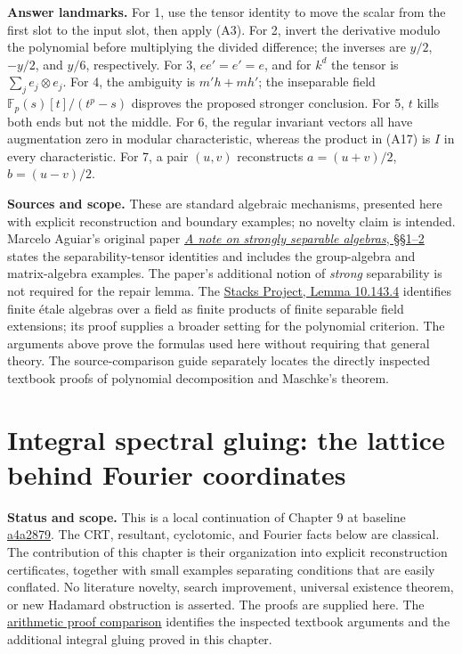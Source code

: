 \documentclass[
  11pt,
]{article}
\begin{document}
\textbf{Answer landmarks.} For 1, use the tensor identity to move the
scalar from the first slot to the input slot, then apply (A3). For 2,
invert the derivative modulo the polynomial before multiplying the
divided difference; the inverses are \(y/2\), \(-y/2\), and \(y/6\),
respectively. For 3, \(ee'=e'=e\), and for \(k^d\) the tensor is
\(\sum_j e_j\otimes e_j\). For 4, the ambiguity is \(m'h+mh'\); the
inseparable field \(\mathbb F_p(s)[t]/(t^p-s)\) disproves the proposed
stronger conclusion. For 5, \(t\) kills both ends but not the middle.
For 6, the regular invariant vectors all have augmentation zero in
modular characteristic, whereas the product in (A17) is \(I\) in every
characteristic. For 7, a pair \((u,v)\) reconstructs \(a=(u+v)/2\),
\(b=(u-v)/2\).

\textbf{Sources and scope.} These are standard algebraic mechanisms,
presented here with explicit reconstruction and boundary examples; no
novelty claim is intended. Marcelo Aguiar's original paper
\href{https://pi.math.cornell.edu/~maguiar/strongly.pdf}{\emph{A note on
strongly separable algebras}, §§1--2} states the separability-tensor
identities and includes the group-algebra and matrix-algebra examples.
The paper's additional notion of \emph{strong} separability is not
required for the repair lemma. The
\href{https://stacks.math.columbia.edu/tag/00U3}{Stacks Project, Lemma
10.143.4} identifies finite étale algebras over a field as finite
products of finite separable field extensions; its proof supplies a
broader setting for the polynomial criterion. The arguments above prove
the formulas used here without requiring that general theory. The
source-comparison guide separately locates the directly inspected
textbook proofs of polynomial decomposition and Maschke's theorem.

\section{Integral spectral gluing: the lattice behind Fourier
coordinates}\label{integral-spectral-gluing-the-lattice-behind-fourier-coordinates}

\textbf{Status and scope.} This is a local continuation of Chapter 9 at
baseline
\href{https://github.com/Drsunflowerherbert/Codex-for-Math/tree/a4a28796bdd63c5cbddbfba698c95d34728bd94c}{a4a2879}.
The CRT, resultant, cyclotomic, and Fourier facts below are classical.
The contribution of this chapter is their organization into explicit
reconstruction certificates, together with small examples separating
conditions that are easily conflated. No literature novelty, search
improvement, universal existence theorem, or new Hadamard obstruction is
asserted. The proofs are supplied here. The
\href{PROOF-COMPARISON-ARITHMETIC.md}{arithmetic proof comparison}
identifies the inspected textbook arguments and the additional integral
gluing proved in this chapter.
\end{document}
